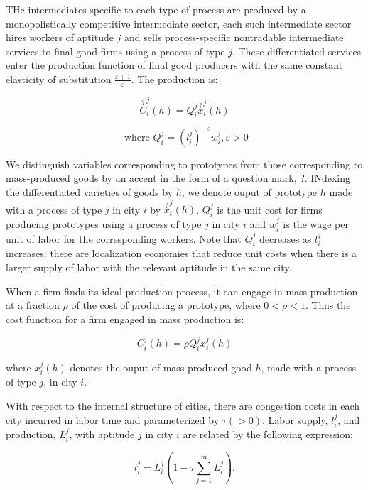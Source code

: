 THe intermediates specific to each type of process are produced by a monopolistically competitive intermediate sector, each such intermediate sector hires workers of aptitude $j$ and sells process-specific nontradable intermediate services to final-good firms using a process of type $j$. These differentiated services enter the production function of final good producers with the same constant elasticity of substitution $\frac{\varepsilon + 1}{\varepsilon}$. The production is:

\begin{equation}
  \overset{?}{C}_i^j(h) = Q_i^j \overset{?}{x}_i^j (h)
\end{equation}

\begin{equation}
  \text{ where } Q_i^j = (l_i^j)^{-\varepsilon} w_i^j, \varepsilon > 0 
\end{equation}

We distinguish variables corresponding to prototypes from those corresponding to mass-produced goods by an accent in the form of a question mark, ?. INdexing the differentiated varieties of goods by $h$, we denote ouput of prototype $h$ made with a process of type $j$ in city $i$ by $\overset{?}{x}_i^j(h)$. $Q_i^j$ is the unit cost for firms producing prototypes using a process of type $j$  in city $i$ and $w_i^j$ is the wage per unit of labor for the corresponding workers. Note that $Q_i^j$ decreases as $l_i^j$ increases: there are localization economies that reduce unit costs when there is a larger supply of labor with the relevant aptitude in the same city.

When a firm finds its ideal production process, it can engage in mass production at a fraction $\rho$ of the cost of producing a prototype, where $0 < \rho < 1$. Thus the cost function for a firm engaged in mass production is:

\begin{equation}
  C_i^j(h) = \rho Q_i^j x_i^j(h)
\end{equation}

where $x_i^j(h)$ denotes the ouput of mass produced good $h$, made with a process of type $j$, in city $i$.

With respect to the internal structure of cities, there are congestion costs in each city incurred in labor time and parameterized by $\tau (> 0)$. Labor supply, $l_i^j$, and production, $L_i^j$, with aptitude $j$ in city $i$ are related by the following expression:

\begin{equation}
  l_i^j = L_i^j(1 - \tau \sum_{j=1}^m L_i^j).
\end{equation}

